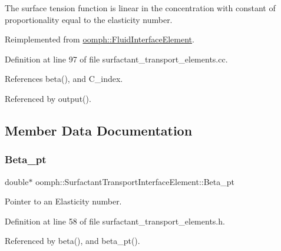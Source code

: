 The surface tension function is linear in the concentration with constant of proportionality equal to the elasticity number. 

Reimplemented from \hyperlink{classoomph_1_1FluidInterfaceElement_a7e5c3ca1eba5d4dd44c0eab9be252c2a}{oomph\+::\+Fluid\+Interface\+Element}.



Definition at line 97 of file surfactant\+\_\+transport\+\_\+elements.\+cc.



References beta(), and C\+\_\+index.



Referenced by output().



\subsection{Member Data Documentation}
\mbox{\label{classoomph_1_1SurfactantTransportInterfaceElement_ab5140eb5a576820321032b10a894b530}} 
\subsubsection{\texorpdfstring{Beta\+\_\+pt}{Beta\_pt}}
{\footnotesize\ttfamily double$\ast$ oomph\+::\+Surfactant\+Transport\+Interface\+Element\+::\+Beta\+\_\+pt\hspace{0.3cm}{\ttfamily [private]}}



Pointer to an Elasticity number. 



Definition at line 58 of file surfactant\+\_\+transport\+\_\+elements.\+h.



Referenced by beta(), and beta\+\_\+pt().

\mbox{\label{classoomph_1_1SurfactantTransportInterfaceElement_a26727fb7b57f88d3e1bdf4f2dd9f3b02}} 
